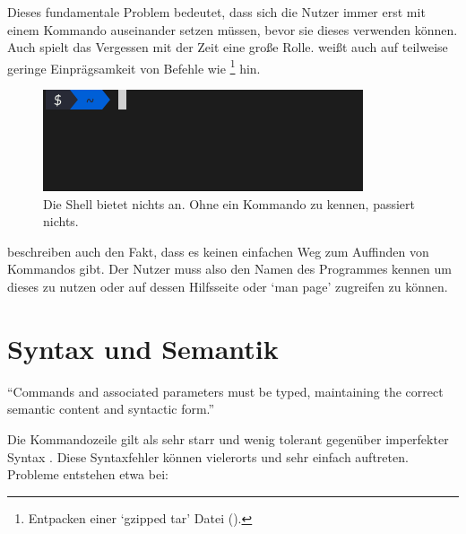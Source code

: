 \documentclass[oneside,bibliography=totocnumbered,BCOR=5mm]{scrbook}
\begin{document}
\bigskip

\newcommand{\refcr}[1]{\hyperref[prob:cr]{#1}}
\newcommand{\refcrr}{\hyperref[prob:cr]{`Command Recall'}}

\bigskip

Dieses fundamentale Problem bedeutet, dass sich die Nutzer immer erst mit einem
Kommando auseinander setzen müssen, bevor sie dieses verwenden können. Auch
spielt das Vergessen mit der Zeit eine große Rolle. \textcite{Raskin_2008} weißt
auch auf teilweise geringe Einprägsamkeit von Befehle wie \footnote{Entpacken einer `gzipped tar' Datei ().}
hin.

\begin{figure}[H]
  \centering
  \includegraphics[scale=0.5]{empty-prompt.png}
  \caption{Die Shell bietet nichts an. Ohne ein Kommando zu kennen, passiert nichts.}
\end{figure}

\textcite{Gentner_1996} beschreiben auch den Fakt, dass es keinen einfachen Weg
zum Auffinden von Kommandos gibt. Der Nutzer muss also den Namen des Programmes
kennen um dieses zu nutzen oder auf dessen Hilfsseite oder `man page' zugreifen
zu können.

\section{Syntax und Semantik}

``Commands and associated parameters must be typed, maintaining the correct
semantic content and syntactic form.'' \parencite[184]{Westerman_1997}

\bigskip

\newcommand{\refss}[1]{\hyperref[prob:ss]{#1}}

\bigskip

Die Kommandozeile gilt als sehr starr und wenig tolerant gegenüber imperfekter
Syntax \parencite{Gentner_1996}. Diese Syntaxfehler können vielerorts und sehr
einfach auftreten. Probleme entstehen etwa bei:
\end{document}
